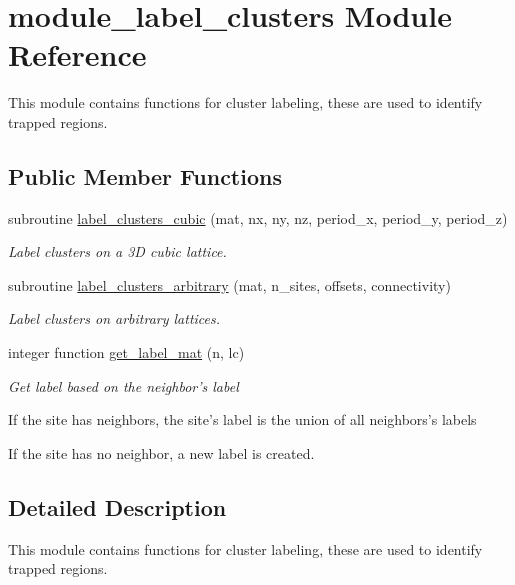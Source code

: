 \hypertarget{classmodule__label__clusters}{
\section{module\-\_\-label\-\_\-clusters \-Module \-Reference}
\label{classmodule__label__clusters}
}


\-This module contains functions for cluster labeling, these are used to identify trapped regions.  


\subsection*{\-Public \-Member \-Functions}
\begin{DoxyCompactItemize}
\item 
subroutine \hyperlink{classmodule__label__clusters_ac59dcadecc65ca2548221f9ea7858382}{label\-\_\-clusters\-\_\-cubic} (mat, nx, ny, nz, period\-\_\-x, period\-\_\-y, period\-\_\-z)
\begin{DoxyCompactList}\small\item\em \-Label clusters on a 3\-D cubic lattice. \end{DoxyCompactList}\item 
subroutine \hyperlink{classmodule__label__clusters_a9b73572fdcc3c709bcd6b67e343b7263}{label\-\_\-clusters\-\_\-arbitrary} (mat, n\-\_\-sites, offsets, connectivity)
\begin{DoxyCompactList}\small\item\em \-Label clusters on arbitrary lattices. \end{DoxyCompactList}\item 
integer function \hyperlink{classmodule__label__clusters_a293fe1439386c2fdcaddda3f2325162c}{get\-\_\-label\-\_\-mat} (n, lc)
\begin{DoxyCompactList}\small\item\em \-Get label based on the neighbor's label \par
 \-If the site has neighbors, the site's label is the union of all neighbors's labels \par
 \-If the site has no neighbor, a new label is created. \end{DoxyCompactList}\end{DoxyCompactItemize}


\subsection{\-Detailed \-Description}
\-This module contains functions for cluster labeling, these are used to identify trapped regions. 

